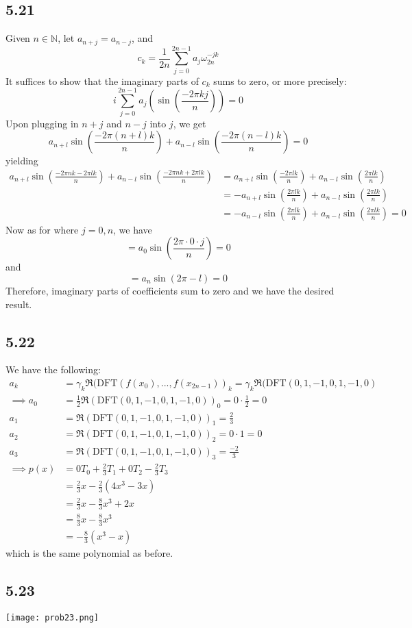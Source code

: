 \documentclass[letterpaper,12pt]{article}
\theoremstyle{definition}
\begin{document}
\subsection*{5.21}
Given $n \in \mathbb{N}$, let $a_{n+j} = a_{n-j}$, and
\[c_k = \frac{1}{2n} \sum_{j = 0}^{2n-1}a_j \omega_{2n}^{-jk}\]
It suffices to show that the imaginary parts of $c_k$ sums to zero, or more precisely:
\[i\sum_{j = 0}^{2n-1}a_j(\sin(\frac{-2\pi k j}{n})) = 0\]
Upon plugging in $n+j$ and $n-j$ into $j$, we get
\[a_{n+l}\sin(\frac{-2\pi (n+l)k}{n}) + a_{n-l}\sin(\frac{-2\pi (n-l) k}{n}) = 0\]
yielding
\begin{align*}
 a_{n+l} \sin(\frac{-2\pi n k - 2\pi l k}{n}) + a_{n-l}\sin(\frac{-2\pi n k + 2 \pi l k}{n}) &=
  a_{n+l} \sin(\frac{- 2\pi l k}{n}) + a_{n-l}\sin(\frac{2 \pi l k}{n}) \\ 
 &= -a_{n+l} \sin(\frac{2\pi l k}{n}) + a_{n-l}\sin(\frac{2 \pi l k}{n}) \\
 &= -a_{n-l} \sin(\frac{2\pi l k}{n}) + a_{n-l}\sin(\frac{2 \pi l k}{n}) = 0 
\end{align*}
 Now as for where $j = 0, n$, we have
 \[=a_0\sin(\frac{2\pi  \cdot 0\cdot j}{n}) = 0\]
 and 
 \[= a_n\sin(2\pi - l) = 0\]
 Therefore, imaginary parts of coefficients sum to zero and we have the desired result.

\subsection*{5.22}
We have the following:
\begin{align*}
a_k &= \gamma _k \Re(\text{DFT}(f(x_0),...,f(x_{2n-1}))_k = \gamma _k \Re(\text{DFT}(0,1,-1,0,1,-1,0) \\
\implies a_0 &=\frac{1}{2} \Re(\text{DFT}(0,1,-1,0,1,-1,0))_0 = 0\cdot \frac{1}{2} = 0\\
a_1 &=\Re(\text{DFT}(0,1,-1,0,1,-1,0))_1= \frac{2}{3}\\
a_2 &=\Re(\text{DFT}(0,1,-1,0,1,-1,0))_2 = 0\cdot 1 = 0\\
a_3 &=\Re(\text{DFT}(0,1,-1,0,1,-1,0))_3 = \frac{-2}{3}\\
\implies p(x) &=  0T_0+ \frac{2}{3}T_1+0T_2-\frac{2}{3}T_3\\&=\frac{2}{3}x-\frac{2}{3}(4x^3-3x)\\
&= \frac{2}{3}x-\frac{8}{3}x^3+2x\\&=\frac{8}{3}x-\frac{8}{3}x^3\\&=-\frac{8}{3}(x^3-x)
\end{align*}
which is the same polynomial as before.

\subsection*{5.23}
\texttt{[image: prob23.png]}
\end{document}
